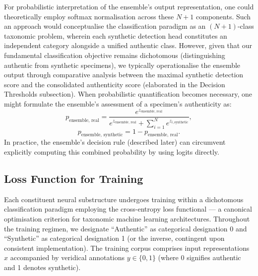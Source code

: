 \documentclass[conference]{IEEEtran}  %
\begin{document}
For probabilistic interpretation of the ensemble's output representation, one could theoretically employ softmax normalisation across these \(N+1\) components. Such an approach would conceptualise the classification paradigm as an \((N+1)\)-class taxonomic problem, wherein each synthetic detection head constitutes an independent category alongside a unified authentic class. However, given that our fundamental classification objective remains dichotomous (distinguishing authentic from synthetic specimens), we typically operationalise the ensemble output through comparative analysis between the maximal synthetic detection score and the consolidated authenticity score (elaborated in the Decision Thresholds subsection). When probabilistic quantification becomes necessary, one might formulate the ensemble's assessment of a specimen's authenticity as:
\begin{equation}
\label{eq:ensemble_prob_real}
p_{\text{ensemble, real}} = \frac{e^{z_{\text{ensemble, real}}}}{e^{z_{\text{ensemble, real}}} + \sum_{i=1}^N e^{z_{i,\text{synthetic}}}},
\end{equation}
\begin{equation}
\label{eq:ensemble_prob_synthetic}
p_{\text{ensemble, synthetic}} = 1 - p_{\text{ensemble, real}}.
\end{equation}
In practice, the ensemble’s decision rule (described later) can circumvent explicitly computing this combined probability by using logits directly.

\subsection{Loss Function for Training}
Each constituent neural substructure undergoes training within a dichotomous classification paradigm employing the cross-entropy loss functional --- a canonical optimisation criterion for taxonomic machine learning architectures. Throughout the training regimen, we designate ``Authentic'' as categorical designation 0 and ``Synthetic'' as categorical designation 1 (or the inverse, contingent upon consistent implementation). The training corpus comprises input representations \(x\) accompanied by veridical annotations \(y \in \{0,1\}\) (where 0 signifies authentic and 1 denotes synthetic).
\end{document}
